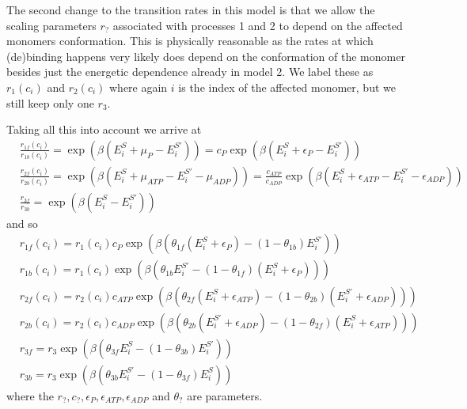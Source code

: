 \documentclass[11pt]{article}
\begin{document}
The second change to the transition rates in this model is that we allow the scaling parameters $r_?$ associated with processes 1 and 2 to depend on the affected monomers conformation.
This is physically reasonable as the rates at which (de)binding happens very likely does depend on the conformation of the monomer besides just the energetic dependence already in model 2.
We label these as $r_1(c_i)$ and $r_2(c_i)$ where again $i$ is the index of the affected monomer, but we still keep only one $r_3$.

Taking all this into account we arrive at
\begin{align}
    &\frac{r_{1f}(c_i)}{r_{1b}(c_i)} = \exp(\beta(E_i^S+\mu_P-E_i^{S'})) = c_P\exp(\beta(E_i^S+\epsilon_P-E_i^{S'})) \\
    &\frac{r_{2f}(c_i)}{r_{2b}(c_i)} = \exp(\beta(E_i^S+\mu_{ATP}-E_i^{S'}-\mu_{ADP})) = \frac{c_{ATP}}{c_{ADP}}\exp(\beta(E_i^S+\epsilon_{ATP}-E_i^{S'}-\epsilon_{ADP})) \\
    &\frac{r_{3f}}{r_{3b}} = \exp(\beta(E_i^S-E_i^{S'}))
\end{align}
and so
\begin{align}
    &r_{1f}(c_i) = r_1(c_i)c_P\exp(\beta(\theta_{1f}(E_i^S+\epsilon_P)-(1-\theta_{1b})E_i^{S'})) \label{eq:rate1f} \\
    &r_{1b}(c_i) = r_1(c_i)\exp(\beta(\theta_{1b}E_i^{S'}-(1-\theta_{1f})(E_i^S+\epsilon_P))) \label{eq:rate1b} \\
    &r_{2f}(c_i) = r_2(c_i)c_{ATP}\exp(\beta(\theta_{2f}(E_i^S+\epsilon_{ATP})-(1-\theta_{2b})(E_i^{S'}+\epsilon_{ADP}))) \label{eq:rate2f} \\
    &r_{2b}(c_i) = r_2(c_i)c_{ADP}\exp(\beta(\theta_{2b}(E_i^{S'}+\epsilon_{ADP})-(1-\theta_{2f})(E_i^S+\epsilon_{ATP}))) \label{eq:rate2b} \\
    &r_{3f} = r_3\exp(\beta(\theta_{3f}E_i^S-(1-\theta_{3b})E_i^{S'})) \label{eq:rate3f} \\
    &r_{3b} = r_3\exp(\beta(\theta_{3b}E_i^{S'}-(1-\theta_{3f})E_i^S)) \label{eq:rate3b}
\end{align}
where the $r_?,c_?,\epsilon_P,\epsilon_{ATP},\epsilon_{ADP}$ and $\theta_?$ are parameters.
\end{document}
